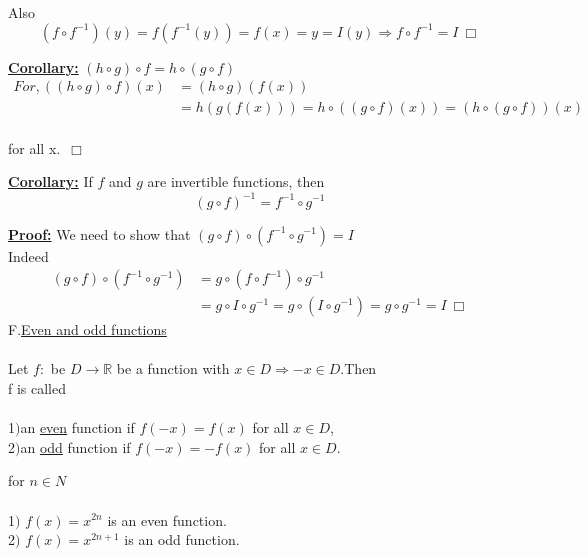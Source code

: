 \documentclass[11pt]{amsbook}
\begin{document}
Also
\begin{equation*}
(f \circ f^{-1}) (y) = f(f^{-1}(y)) = f(x) = y = I(y) \Rightarrow f \circ f^ {-1} = I ~ \Box
\end{equation*}

\textbf{\underline{Corollary:}} $(h \circ g)\circ f  = h \circ (g \circ f)$
\\
\begin{align*}
For, ((h \circ g)\circ f)(x) &= (h \circ g)(f(x))\\
&=h(g(f(x))) = h \circ ((g \circ f)(x)) = (h \circ (g \circ f))(x)
\end{align*}
\\for all x.~$\Box$

\textbf{\underline{Corollary:}} If $ f$ and $g $ are invertible functions, then 
\begin{equation*}
(g \circ f)^{-1} = f^{-1} \circ g^{-1}
\end{equation*}

\textbf{\underline{Proof:}} We need to show that $(g \circ f)\circ(f^{-1} \circ g^{-1}) = I $
\\Indeed\\
\begin{align*}
(g \circ f) \circ (f^{-1} \circ g^{-1}) &= g \circ(f \circ f^{-1}) \circ g^{-1}\\
 &= g \circ I \circ g^{-1} = g \circ (I \circ g^{-1}) = g \circ g^{-1} =  I ~ \Box
\end{align*}
F.\underline{Even and odd functions}\\
\\
Let $f:$ be $D \rightarrow \mathbb{R}$ be a function with $x\in D \Rightarrow -x\in D$.Then\\
f is called\\
\\
	1$)$an \underline{even} function if $f(-x)=f(x)$ for all $x\in D$,\\
	2$)$an \underline{odd} function if $f(-x)=-f(x)$ for all $x\in D$.\\
\begin{exmp} 
for $n\in N$\\
 \\
	1$)$ $f(x)=x^{2n}$ is an even function.\\
	2$)$ $f(x)=x^{2n+1}$ is an odd function.\\
\end{exmp}
\end{document}
